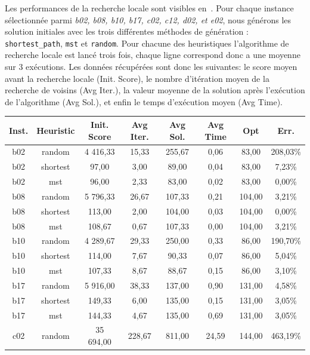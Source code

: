 \documentclass[10pt]{article}
\begin{document}
	Les performances de la recherche locale sont visibles en~. Pour chaque instance sélectionnée parmi \textit{b02, b08, b10, b17, c02, c12, d02, et e02}, nous générons les solution initiales avec les trois différentes méthodes de génération : \texttt{shortest\_path}, \texttt{mst} et \texttt{random}. Pour chacune des heuristiques l'algorithme de recherche locale est lancé trois fois, chaque ligne correspond donc a une moyenne sur 3 exécutions. Les données récupérées sont donc les suivantes: le score moyen avant la recherche locale (Init. Score), le nombre d'itération moyen de la recherche de voisins (Avg Iter.), la valeur moyenne de la solution après l'exécution de l'algorithme (Avg Sol.), et enfin le temps d'exécution moyen (Avg Time). 
	\begin{table}[h!]
		\centering
		\begin{tabular}{|c|c|c|c|c|c|c|c|}
		\hline
\textbf{Inst.} & \textbf{Heuristic} & \textbf{Init. \linebreak Score} & \textbf{Avg Iter.} & \textbf{Avg Sol.} & \textbf{Avg Time} & \textbf{Opt} & \textbf{Err.} \\
\hline
b02 & random & 4 416,33 & 15,33 & 255,67 & 0,06 & 83,00 & 208,03\% \\
b02 & shortest & 97,00 & 3,00 & 89,00 & 0,04 & 83,00 & 7,23\% \\
\rowcolor{yellow!60} b02 & mst & 96,00 & 2,33 & 83,00 & 0,02 & 83,00 & 0,00\% \\
\hline
b08 & random & 5 796,33 & 26,67 & 107,33 & 0,21 & 104,00 & 3,21\% \\
\rowcolor{yellow!60} b08 & shortest & 113,00 & 2,00 & 104,00 & 0,03 & 104,00 & 0,00\% \\
b08 & mst & 108,67 & 0,67 & 107,33 & 0,00 & 104,00 & 3,21\% \\
\hline
b10 & random & 4 289,67 & 29,33 & 250,00 & 0,33 & 86,00 & 190,70\% \\
b10 & shortest & 114,00 & 7,67 & 90,33 & 0,07 & 86,00 & 5,04\% \\
\rowcolor{yellow!60} b10 & mst & 107,33 & 8,67 & 88,67 & 0,15 & 86,00 & 3,10\% \\
\hline
b17 & random & 5 916,00 & 38,33 & 137,00 & 0,90 & 131,00 & 4,58\% \\
\rowcolor{yellow!60} b17 & shortest & 149,33 & 6,00 & 135,00 & 0,15 & 131,00 & 3,05\% \\
\rowcolor{yellow!60} b17 & mst & 144,33 & 4,67 & 135,00 & 0,69 & 131,00 & 3,05\% \\
\hline
c02 & random & 35 694,00 & 228,67 & 811,00 & 24,59 & 144,00 & 463,19\% \\

\end{tabular}
\end{table}
\end{document}
